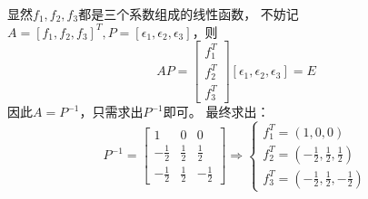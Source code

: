 \begin{solution}
  显然$f_1,f_2,f_3$都是三个系数组成的线性函数，
  不妨记$A = [f_1, f_2,f_3]^T, P = [\epsilon_1,\epsilon_2,\epsilon_3]$，则
  \begin{equation*}
    AP = \left[
      \begin{array}{c}
        f_1^T\\
        f_2^T\\
        f_3^T
      \end{array}
    \right] \left[ \epsilon_1, \epsilon_2, \epsilon_3 \right] = E
  \end{equation*}
  因此$A = P^{-1}$，只需求出$P^{-1}$即可。
  最终求出：
  \begin{equation*}
    P^{-1} = \left[
      \begin{array}{ccc}
        1&0&0 \\
         - \frac{1}{2}& \frac{1}{2}& \frac{1}{2} \\
         - \frac{1}{2}& \frac{1}{2}&- \frac{1}{2}
      \end{array}
    \right]
    \Rightarrow
    \begin{cases}
      f_1^T = (1,0,0)\\
      f_2^T = (- \frac{1}{2}, \frac{1}{2}, \frac{1}{2})\\
      f_3^T = (- \frac{1}{2}, \frac{1}{2}, - \frac{1}{2})
    \end{cases}
  \end{equation*}
\end{solution}








